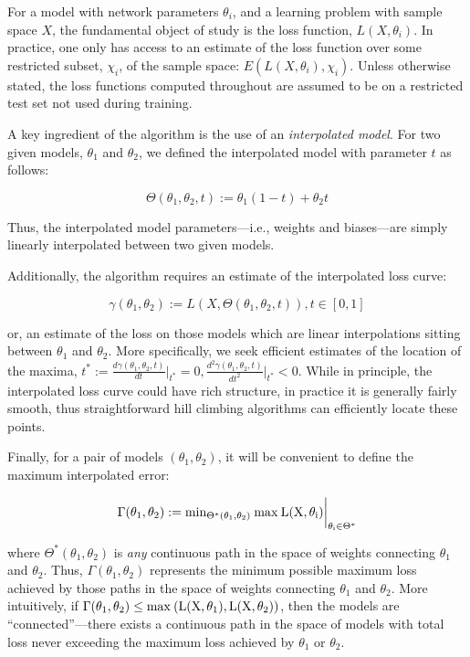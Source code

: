 \documentclass[twocolumn,superscriptaddress,aps,prb,floatfix]{revtex4-1}
\begin{document}
 For a model with network parameters $\theta_i$, and a learning problem with sample space $X$, the fundamental object of study is the loss function, $L(X, \theta_i)$.  In practice, one only has access to an estimate of the loss function over some restricted subset, $\chi_i$, of the sample space: $E( L(X, \theta_i), \chi_i )$.  Unless otherwise stated, the loss functions computed throughout are assumed to be on a restricted test set not used during training.
 
 A key ingredient of the algorithm is the use of an \emph{interpolated model}.  For two given models, $\theta_1$ and $\theta_2$, we defined the interpolated model with parameter $t$ as follows:
 
\begin{equation}
\Theta (\theta_1 ,\theta_2, t) := \theta_1 (1-t) + \theta_2 t
\end{equation}

 Thus, the interpolated model parameters---i.e., weights and biases---are simply linearly interpolated between two given models.
 
 Additionally, the algorithm requires an estimate of the interpolated loss curve:

 \begin{equation}
 \gamma(\theta_1, \theta_2) := L (X ,\Theta (\theta_1, \theta_2, t)), t \in [0,1]
 \end{equation}

 or, an estimate of the loss on those models which are linear interpolations sitting between $\theta_1$ and $\theta_2$.  More specifically, we seek efficient estimates of the location of the maxima, $t^* := \frac{d \gamma(\theta_1, \theta_2, t)}{dt} \bigg|_{t^*} = 0, \frac{d^2 \gamma(\theta_1, \theta_2, t)}{dt^2} \bigg|_{t^*} < 0$.  While in principle, the interpolated loss curve could have rich structure, in practice it is generally fairly smooth, thus straightforward hill climbing algorithms can efficiently locate these points.
 
 Finally, for a pair of models $(\theta_1, \theta_2)$, it will be convenient to define the maximum interpolated error:
 
  \begin{equation}
  \Gamma(\theta_1, \theta_2) := \rm{min}_{\Theta^*(\theta_1, \theta_2)}\:\rm{max}\:L (X, \theta_i) \bigg|_{\theta_i \in \Theta^*} \label{eq:minmaxerror}
  \end{equation}
 
 where $\Theta^* (\theta_1, \theta_2)$ is \emph{any} continuous path in the space of weights connecting $\theta_1$ and $\theta_2$.  Thus, $\Gamma(\theta_1, \theta_2)$ represents the minimum possible maximum loss achieved by those paths in the space of weights connecting $\theta_1$ and $\theta_2$.  More intuitively, if $\Gamma (\theta_1, \theta_2) \leq \rm{max}\: (L(X,\theta_1), L(X,\theta_2))$, then the models are ``connected''---there exists a continuous path in the space of models with total loss never exceeding the maximum loss achieved by $\theta_1$ or $\theta_2$. 
 
\end{document}
